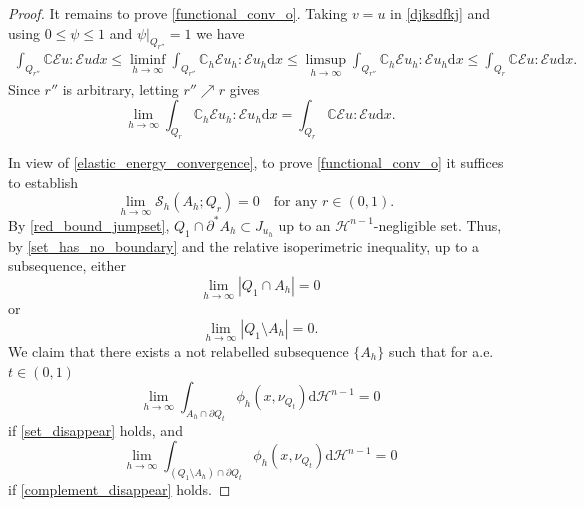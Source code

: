 \documentclass[reqno]{amsart}
\numberwithin{equation}{section}
\theoremstyle{plain}
\theoremstyle{definition}
\newcommand{\C}{\mathbb{C}}
\newcommand{\cH}{\mathcal{H}}
\newcommand{\cS}{\mathcal{S}}
\newcommand{\p}{\partial}
\renewcommand{\d}{\mathrm{d}}
\newcommand{\str}[1]{\mathcal{E}#1}
\begin{document}
\begin{proof}
It remains to prove \eqref{functional_conv_o}.
Taking $v=u$ in \eqref{djksdfkj} and using $0\le \psi\le1$ and $\psi\big|_{Q_{r''}}=1$
we have
\begin{align*} 
\int_{Q_{r''}}\C \str{u}:\str{u}dx\le
\liminf\limits_{h\to\infty} \int_{Q_{r''}}\C_h \str{u_h}:\str{u_h}\d x
\le
\limsup\limits_{h\to\infty} \int_{Q_{r''}}\C_h \str{u_h}:\str{u_h}\d x \le
\int_{Q_r}\C \str{u}:\str{u}\d x. 
\end{align*}
Since $r''$ is arbitrary, letting $r''\nearrow r $ gives
\begin{equation}\label{elastic_energy_convergence} 
\lim\limits_{h\to\infty} \int_{Q_r}\C_h \str{u_h}:\str{u_h}\d x =
\int_{Q_r}\C \str{u}:\str{u}\d x.  
\end{equation}


In view of \eqref{elastic_energy_convergence},  to prove \eqref{functional_conv_o} it suffices to establish
%
\begin{equation}\label{surface_jugoldi}
\lim\limits_{h\to\infty}  \cS_h(A_h;Q_r) =0 \quad\text{for any $r\in(0,1).$ }
\end{equation}
%
By \eqref{red_bound_jumpset}, $Q_1\cap \p^*A_h\subset J_{u_h}$ up to an $\cH^{n-1}$-negligible set. Thus, by \eqref{set_has_no_boundary} and the relative isoperimetric inequality, up to a subsequence, either
%
\begin{equation}\label{set_disappear}
\lim\limits_{h\to\infty} |Q_1\cap A_h| =0 
\end{equation}
or 
\begin{equation}\label{complement_disappear}
\lim\limits_{h\to\infty} |Q_1\setminus A_h| =0. 
\end{equation}
%
We claim that there exists a not relabelled subsequence $\{A_h\}$ such that for a.e.\  $t\in(0,1)$ 
\begin{equation}\label{set_in_cube_bound0}
\lim\limits_{h\to\infty}   \int_{A_h \cap \p Q_t} \phi_h(x,\nu_{Q_t})\d \cH^{n-1} =0
\end{equation}
%
if \eqref{set_disappear} holds, and 
%
\begin{equation}\label{compl_in_cube_bound0}
\lim\limits_{h\to\infty}   \int_{(Q_1\setminus A_h) \cap \p Q_t} \phi_h(x,\nu_{Q_t})\d \cH^{n-1} =0
\end{equation}
if \eqref{complement_disappear} holds. 
%


\end{proof}
\end{document}
